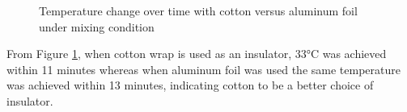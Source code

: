 \begin{figure}[h]
    \centering
    \caption{Temperature change over time with cotton versus aluminum foil under mixing condition}
    \label{gr:InsulationMethods}
\end{figure}

From Figure \ref{gr:InsulationMethods}, when cotton wrap is used as an insulator, 33\si{\celsius} was achieved within 11 minutes whereas when aluminum foil was used the same temperature was achieved within 13 minutes, indicating cotton to be a better choice of insulator.

